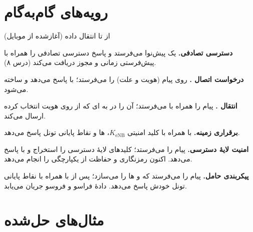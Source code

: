 \documentclass[11pt,a4paper]{article}
\begin{document}
\section{رویه‌های گام‌به‌گام}
\begin{procedurebox}{از  تا انتقال داده (آغازشده از موبایل)}\label{proc:idle2conn}
\begin{steps}
  \item \textbf{دسترسی تصادفی.}  یک پیش‌نوا می‌فرستد و پاسخ دسترسی تصادفی را همراه با پیش‌فرستی
        زمانی و مجوز دریافت می‌کند (درس ۸).
  \item \textbf{درخواست اتصال .} روی  پیام  (هویت و علت) را
        می‌فرستد؛  با  پاسخ می‌دهد و  ساخته می‌شود.
  \item \textbf{انتقال .}  پیام  را همراه با 
         می‌فرستد؛  آن را در   به ای که
        از روی هویت  انتخاب کرده ارسال می‌کند.
  \item \textbf{برقراری زمینه.}  با   همراه با کلید امنیتی
        $K_{\mathrm{eNB}}$، ها و نقاط پایانی تونل  پاسخ می‌دهد.
  \item \textbf{امنیت لایهٔ دسترسی.}  پیام  را می‌فرستد؛  کلیدهای
        لایهٔ دسترسی را استخراج و با  پاسخ می‌دهد. اکنون  رمزنگاری و
        حفاظت از یکپارچگی را انجام می‌دهد.
  \item \textbf{پیکربندی حامل.}  پیام  را می‌فرستد که  و
        ها را می‌سازد؛ پس از  با  همراه
        با نقاط پایانی تونل  خودش پاسخ می‌دهد. دادهٔ فراسو و فروسو جریان می‌یابد.
\end{steps}
\end{procedurebox}

\section{مثال‌های حل‌شده}
\end{document}
